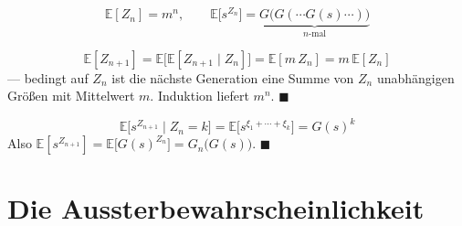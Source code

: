 \begin{merksatz}
\[ \mathbb{E}[Z_n] = m^{n}, \qquad \mathbb{E}\bigl[s^{Z_n}\bigr] = \underbrace{G\bigl(G(\cdots G(s)\cdots)\bigr)}_{n\text{-mal}} \]

\[ \mathbb{E}[Z_{n+1}] = \mathbb{E}\bigl[\mathbb{E}[Z_{n+1} \mid Z_n]\bigr] = \mathbb{E}[m\,Z_n] = m\,\mathbb{E}[Z_n] \]
--- bedingt auf $Z_n$ ist die nächste Generation eine Summe von $Z_n$ unabhängigen Größen mit Mittelwert $m$. Induktion liefert $m^n$. $\blacksquare$

\[ \mathbb{E}\bigl[s^{Z_{n+1}} \mid Z_n = k\bigr] = \mathbb{E}\bigl[s^{\xi_1+\cdots+\xi_k}\bigr] = G(s)^{k} \]
Also $\mathbb{E}[s^{Z_{n+1}}] = \mathbb{E}\bigl[G(s)^{Z_n}\bigr] = G_n\bigl(G(s)\bigr)$. $\blacksquare$

\begin{center}
\begin{minipage}{0.88\textwidth}
\end{minipage}
\end{center}
\end{merksatz}

\section{Die Aussterbewahrscheinlichkeit}

